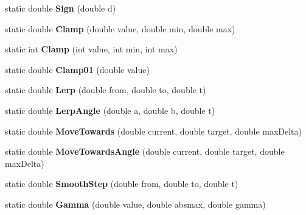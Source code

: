 \begin{DoxyCompactItemize}
static double {\bfseries Sign} (double d)
\item 
\mbox{\label{struct_unity_engine_1_1_mathd_a209be08d7d0f1f474d6db6f3c26e2b24}} 
static double {\bfseries Clamp} (double value, double min, double max)
\item 
\mbox{\label{struct_unity_engine_1_1_mathd_a112f1ae569d72e287488bbaf36103d65}} 
static int {\bfseries Clamp} (int value, int min, int max)
\item 
\mbox{\label{struct_unity_engine_1_1_mathd_a942ae367d7d5de3848d48f4ef98820e3}} 
static double {\bfseries Clamp01} (double value)
\item 
\mbox{\label{struct_unity_engine_1_1_mathd_a1b3043d20c25943083e91a9c70c1b7fb}} 
static double {\bfseries Lerp} (double from, double to, double t)
\item 
\mbox{\label{struct_unity_engine_1_1_mathd_a7fab2c65894481c229af507445cacf63}} 
static double {\bfseries Lerp\+Angle} (double a, double b, double t)
\item 
\mbox{\label{struct_unity_engine_1_1_mathd_a300f1fdffcc78b5864dd97631218d4e4}} 
static double {\bfseries Move\+Towards} (double current, double target, double max\+Delta)
\item 
\mbox{\label{struct_unity_engine_1_1_mathd_a7a649aabd32067ec9242869ee140e0b3}} 
static double {\bfseries Move\+Towards\+Angle} (double current, double target, double max\+Delta)
\item 
\mbox{\label{struct_unity_engine_1_1_mathd_a41a5eb188904de993353a502dff5f671}} 
static double {\bfseries Smooth\+Step} (double from, double to, double t)
\item 
\mbox{\label{struct_unity_engine_1_1_mathd_af85b55be5457184d92d707f274ff93c2}} 
static double {\bfseries Gamma} (double value, double absmax, double gamma)
\item 
\mbox{\label{struct_unity_engine_1_1_mathd_a92aed1efcb52271af008e51bf69ce729}} 

\end{DoxyCompactItemize}

